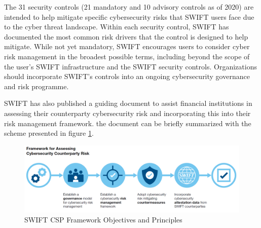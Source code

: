 \documentclass[12pt]{article}
\begin{document}
        The 31 security controls (21 mandatory and 10 advisory controls as of 2020) are intended to help mitigate specific cybersecurity risks that SWIFT users face due to the cyber threat landscape. Within each security control, SWIFT has documented the most common risk drivers that the control is designed to help mitigate. While not yet mandatory, SWIFT encourages users to consider cyber risk management in the broadest possible terms, including beyond the scope of the user's SWIFT infrastructure and the SWIFT security controls. Organizations should incorporate SWIFT's controls into an ongoing cybersecurity governance and risk programme.
        
        SWIFT has also published a guiding document to assist financial institutions in assessing their counterparty cybersecurity risk and incorporating this into their risk management framework. the document can be briefly summarized with the scheme presented in figure \ref{fig:frisk}.
        
        \begin{figure}[H]
        \centering
        \includegraphics[width=\textwidth,cfbox=red 0.1mm 0.1mm]{figures/frisk.png}
        \caption{SWIFT CSP Framework Objectives and Principles}
        \label{fig:frisk}
        \end{figure}
        
\end{document}
